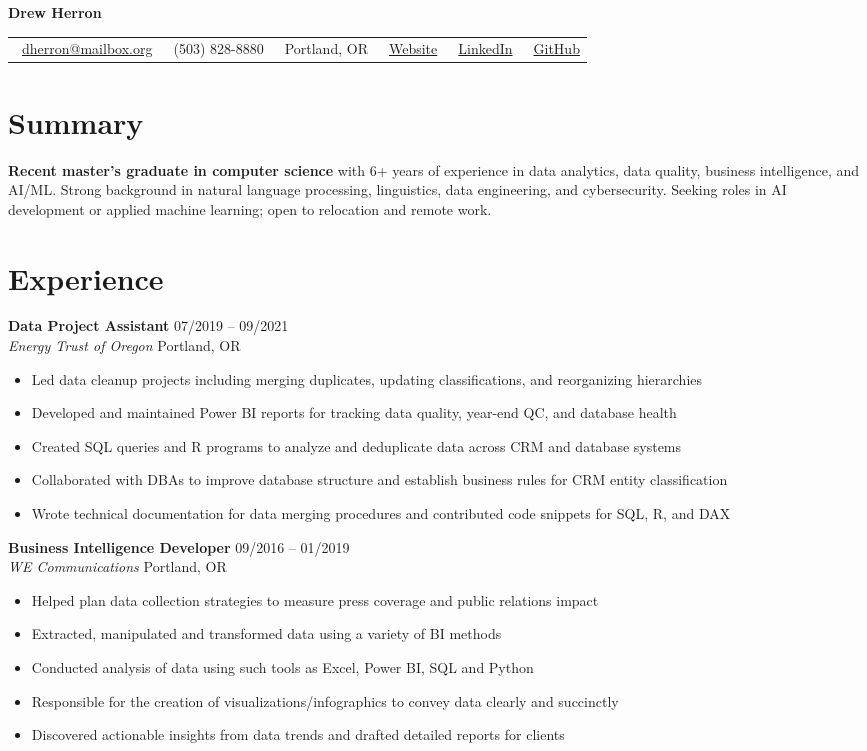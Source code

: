 \documentclass[letterpaper,11pt]{article}
\makeatletter
\newcommand{\contact}[6]{
  \begin{center}
    \begin{tabular*}{\textwidth}{@{\extracolsep{\fill}} l l l l l l}
      \faEnvelope\ \href{mailto:#1}{#1} & 
      \faPhone\ #2 & 
      \faMapMarker*\ #3 & 
      \faGlobe\ \href{#4}{Website} & 
      \faLinkedin\ \href{#5}{LinkedIn} &
      \faGithub\ \href{#6}{GitHub}
    \end{tabular*}
  \end{center}
}
\newcommand{\entry}[4]{
  \vspace{0.1em}
  \noindent\textbf{#1} \hfill #2
  \\ \textit{#3} \hfill #4
  \vspace{0.3em}
}
\newcommand{\achievement}[1]{
  \vspace{-.5em}
  \item #1
}
\makeatother
\begin{document}
\begin{center}
  {\Huge\textbf{Drew Herron}}
\end{center}
  \vspace{-.0cm}
  \contact
    {dherron@mailbox.org}
    {(503) 828-8880}
    {Portland, OR}
    {https://www.drewherron.com}
    {https://www.linkedin.com/in/drew-herron}
    {https://github.com/drewherron}
\vspace{-.4cm}

\section{Summary}
\textbf{Recent master’s graduate in computer science} with 6+ years of experience in data analytics, data quality, business intelligence, and AI/ML. Strong background in natural language processing, linguistics, data engineering, and cybersecurity. Seeking roles in AI development or applied machine learning; open to relocation and remote work.

\vspace{-.1cm}

\section{Experience}

\entry{Data Project Assistant}{07/2019 -- 09/2021}{Energy Trust of Oregon}{Portland, OR}
\begin{itemize}[leftmargin=*]
  \achievement{Led data cleanup projects including merging duplicates, updating classifications, and reorganizing hierarchies}
  \achievement{Developed and maintained Power BI reports for tracking data quality, year-end QC, and database health}
  \achievement{Created SQL queries and R programs to analyze and deduplicate data across CRM and database systems}
  \achievement{Collaborated with DBAs to improve database structure and establish business rules for CRM entity classification}
  \achievement{Wrote technical documentation for data merging procedures and contributed code snippets for SQL, R, and DAX}
\end{itemize}

\entry{Business Intelligence Developer}{09/2016 -- 01/2019}{WE Communications}{Portland, OR}
\begin{itemize}[leftmargin=*]
  \achievement{Helped plan data collection strategies to measure press coverage and public relations impact}
  \achievement{Extracted, manipulated and transformed data using a variety of BI methods}
  \achievement{Conducted analysis of data using such tools as Excel, Power BI, SQL and Python}
  \achievement{Responsible for the creation of visualizations/infographics to convey data clearly and succinctly}
  \achievement{Discovered actionable insights from data trends and drafted detailed reports for clients}
\end{itemize}
\end{document}
